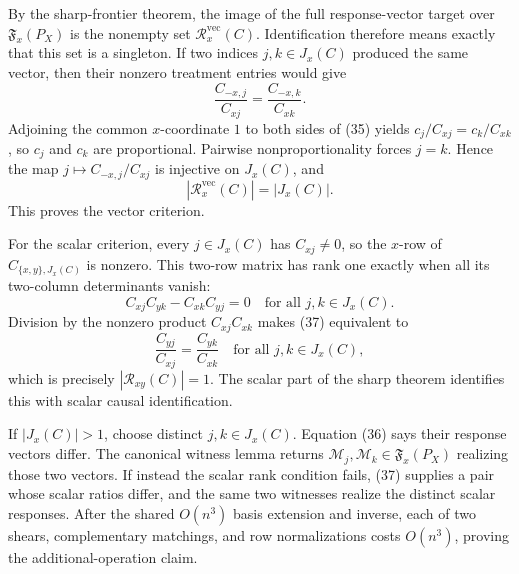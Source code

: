 By the sharp-frontier theorem, the image of the full response-vector target over \(\mathfrak F_x(P_X)\) is the nonempty set \(\mathcal R_x^{\mathrm{vec}}(C)\). Identification therefore means exactly that this set is a singleton. If two indices \(j,k\in J_x(C)\) produced the same vector, then their nonzero treatment entries would give
\[
 \frac{C_{-x,j}}{C_{xj}}=\frac{C_{-x,k}}{C_{xk}}. \tag{35}
\]
Adjoining the common \(x\)-coordinate \(1\) to both sides of (35) yields \(c_j/C_{xj}=c_k/C_{xk}\), so \(c_j\) and \(c_k\) are proportional. Pairwise nonproportionality forces \(j=k\). Hence the map \(j\mapsto C_{-x,j}/C_{xj}\) is injective on \(J_x(C)\), and
\[
 |\mathcal R_x^{\mathrm{vec}}(C)|=|J_x(C)|. \tag{36}
\]
This proves the vector criterion.

For the scalar criterion, every \(j\in J_x(C)\) has \(C_{xj}\ne0\), so the \(x\)-row of \(C_{\{x,y\},J_x(C)}\) is nonzero. This two-row matrix has rank one exactly when all its two-column determinants vanish:
\[
 C_{xj}C_{yk}-C_{xk}C_{yj}=0
 \quad\text{for all }j,k\in J_x(C). \tag{37}
\]
Division by the nonzero product \(C_{xj}C_{xk}\) makes (37) equivalent to
\[
 \frac{C_{yj}}{C_{xj}}=\frac{C_{yk}}{C_{xk}}
 \quad\text{for all }j,k\in J_x(C), \tag{38}
\]
which is precisely \(|\mathcal R_{xy}(C)|=1\). The scalar part of the sharp theorem identifies this with scalar causal identification.

If \(|J_x(C)|>1\), choose distinct \(j,k\in J_x(C)\). Equation (36) says their response vectors differ. The canonical witness lemma returns \(\mathcal M_j,\mathcal M_k\in\mathfrak F_x(P_X)\) realizing those two vectors. If instead the scalar rank condition fails, (37) supplies a pair whose scalar ratios differ, and the same two witnesses realize the distinct scalar responses. After the shared \(O(n^3)\) basis extension and inverse, each of two shears, complementary matchings, and row normalizations costs \(O(n^3)\), proving the additional-operation claim.